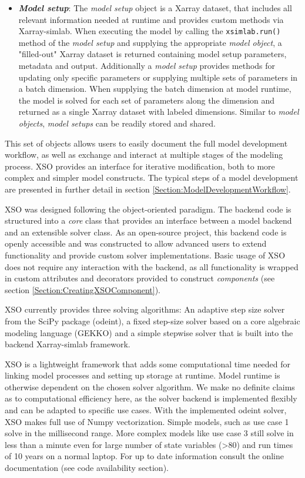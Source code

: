 \documentclass[journal abbreviation, manuscript]{copernicus}
\begin{document}
\begin{itemize}
    \item \textbf{\textit{Model setup}}:
    The \textit{model setup} object is a Xarray dataset, that includes all relevant information needed at runtime and provides custom methods via Xarray-simlab. When executing the model by calling the \texttt{xsimlab.run()} method of the \textit{model setup} and supplying the appropriate \textit{model object}, a "filled-out" Xarray dataset is returned containing model setup parameters, metadata and output. Additionally a \textit{model setup} provides methods for updating only specific parameters or supplying multiple sets of parameters in a batch dimension. When supplying the batch dimension at model runtime, the model is solved for each set of parameters along the dimension and returned as a single Xarray dataset with labeled dimensions. Similar to \textit{model objects}, \textit{model setups} can be readily stored and shared.
\end{itemize}

This set of objects allows users to easily document the full model development workflow, as well as exchange and interact at multiple stages of the modeling process. XSO provides an interface for iterative modification, both to more complex and simpler model constructs. The typical steps of a model development are presented in further detail in section \ref{Section:ModelDevelopmentWorkflow}.

XSO was designed following the object-oriented paradigm. The backend code is structured into a \textit{core} class that provides an interface between a model backend and an extensible solver class. As an open-source project, this backend code is openly accessible and was constructed to allow advanced users to extend functionality and provide custom solver implementations. Basic usage of XSO does not require any interaction with the backend, as all functionality is wrapped in custom attributes and decorators provided to construct \textit{components} (see section \ref{Section:CreatingXSOComponent}). 

XSO currently provides three solving algorithms: An adaptive step size solver from the SciPy package (odeint), a fixed step-size solver based on a core algebraic modeling language (GEKKO) and a simple stepwise solver that is built into the backend Xarray-simlab framework.

XSO is a lightweight framework that adds some computational time needed for linking model processes and setting up storage at runtime. Model runtime is otherwise dependent on the chosen solver algorithm. We make no definite claims as to computational efficiency here, as the solver backend is implemented flexibly and can be adapted to specific use cases. With the implemented odeint solver, XSO makes full use of Numpy vectorization. Simple models, such as use case 1 solve in the millisecond range. More complex models like use case 3 still solve in less than a minute even for large number of state variables (>80) and run times of 10 years on a normal laptop.
For up to date information consult the online documentation (see code availability section).
\end{document}
